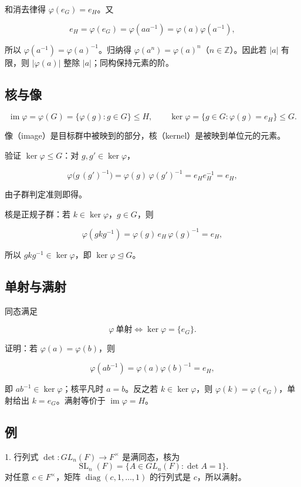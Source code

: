 和消去律得 $\varphi(e_G)=e_H$。又

\[e_H=\varphi(e_G)=\varphi(aa^{-1})=\varphi(a)\varphi(a^{-1}),\]

所以 $\varphi(a^{-1})=\varphi(a)^{-1}$。归纳得 $\varphi(a^n)=\varphi(a)^n$（$n\in\mathbb Z$）。因此若 $|a|$ 有限，则 $|\varphi(a)|$ 整除 $|a|$；同构保持元素的阶。

\subsection{核与像}


\[ \operatorname{im}\varphi=\varphi(G)=\{\varphi(g):g\in G\}\le H,\qquad \ker\varphi=\{g\in G:\varphi(g)=e_H\}\le G. \]

像（image）是目标群中被映到的部分，核（kernel）是被映到单位元的元素。

验证 $\ker\varphi\le G$：对 $g,g'\in\ker\varphi$，

\[\varphi\bigl(g\,(g')^{-1}\bigr)=\varphi(g)\,\varphi(g')^{-1}=e_He_H^{-1}=e_H,\]

由子群判定准则即得。

核是正规子群：若 $k\in\ker\varphi$，$g\in G$，则

\[\varphi(gkg^{-1})=\varphi(g)\,e_H\,\varphi(g)^{-1}=e_H,\]

所以 $gkg^{-1}\in\ker\varphi$，即 $\ker\varphi\trianglelefteq G$。

\subsection{单射与满射}


同态满足

\[\varphi\ \text{单射}\iff\ker\varphi=\{e_G\}.\]

证明：若 $\varphi(a)=\varphi(b)$，则

\[\varphi(ab^{-1})=\varphi(a)\varphi(b)^{-1}=e_H,\]

即 $ab^{-1}\in\ker\varphi$；核平凡时 $a=b$。反之若 $k\in\ker\varphi$，则 $\varphi(k)=\varphi(e_G)$，单射给出 $k=e_G$。满射等价于 $\operatorname{im}\varphi=H$。

\subsection{例}


1. 行列式 $\det:GL_n(F)\to F^\times$ 是满同态，核为
\[\operatorname{SL}_n(F)=\{A\in GL_n(F):\det A=1\}.\]
对任意 $c\in F^\times$，矩阵 $\operatorname{diag}(c,1,\ldots,1)$ 的行列式是 $c$，所以满射。

